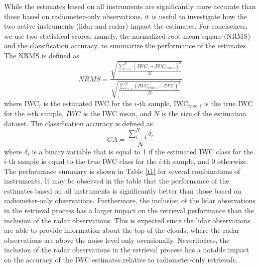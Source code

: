 \documentclass{ametsocV6.1}
\begin{document}
While the estimates based on all instruments are significantly more accurate than those based on radiometer-only
observations, it is useful to investigate how the two active instruments (lidar and radar) impact the
estimates.  For conciseness, we use two statistical scores, namely, the normalized root mean square (NRMS) and
the classification accuracy, to summarize the performance of the estimates.  The NRMS is defined as
\begin{equation}
NRMS=\frac {\sqrt {\frac {\sum_{i=1}^{N} (IWC_{i}-IWC_{true,i})^2} {N}}} {\sqrt {\frac {\sum_{i=1}^{N} (IWC_{true,i}-\overline{IWC})^2} {N}}} 
\end{equation}
where IWC$_{i}$ is the estimated IWC for the $i$-th sample, IWC$_{true,i}$ is the true IWC for the $i$-th sample,
$\overline{IWC}$ is the IWC mean, and $N$ is the size of the estimation dataset.  The classification
accuracy is defined as
\begin{equation}
CA=\frac {\sum_{i=1}^{N} \delta_{i}} {N}
\end{equation}
where $\delta_{i}$ is a binary variable that is equal to 1 if the estimated IWC class for the $i$-th sample is
equal to the true IWC class for the $i$-th sample, and 0 otherwise. The performance summary is shown 
in Table \ref{t1} for several combinations of instruments. It may be observed in the table that the
performance of the estimates based on all instruments is significantly better than those based on
radiometer-only observations.  Furthermore, the inclusion of the lidar observations in the retrieval
process has a larger impact on the retrieval performance than the inclusion of the radar
observations.  This is expected since the lidar observations are able to provide information about the
top of the clouds, where the radar observations are above the noise level only occasionally. Nevertheless,
the inclusion of the radar observations in the retrieval process has a notable impact on the
accuracy of the IWC estimates relative to radiometer-only retrievals. 

\end{document}
